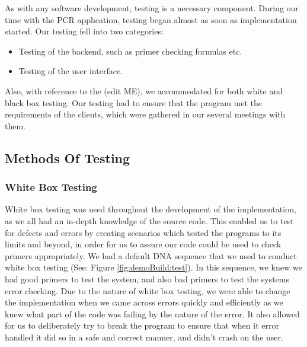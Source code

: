 %
%

As with any software development, testing is a necessary component. During our time with the PCR application, testing began
almost as soon as implementation started. Our testing fell into two categories:

\begin{itemize}
\item Testing of the backend, such as primer checking formulas etc.
\item Testing of the user interface.
\end{itemize}

Also, with reference to the (edit ME)\cite{Lethbridge}, we
accommodated for both white and black box testing. Our testing had to
ensure that the program met the requirements of the clients, which
were gathered in our several meetings with them.

\subsection{Methods Of Testing}
\subsubsection{White Box Testing}
White box testing was used throughout the development of the
implementation, as we all had an in-depth knowledge of the source
code. 
This enabled us to test for defects and errors by creating
scenarios which tested the programs to its limits and beyond, in order
for us to assure our code could be used to check primers
appropriately. 
We had a default DNA sequence that we used to conduct white box
testing (See: Figure \ref{fig:demoBuild:test}).
In this sequence, we knew we had good primers to test the system, and
also bad primers to test the systems error checking. 
Due to the nature of white box testing, we were able to change the
implementation when we came across errors quickly and efficiently as
we knew what part of the code was failing by the nature of the error.
It also allowed for us to deliberately try to break the program to
ensure that when it error handled it did so in a safe and correct
manner, and didn't crash on the user.

